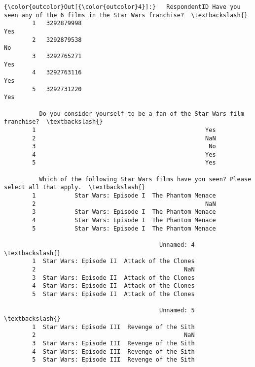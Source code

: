 \documentclass[11pt]{article}
\begin{document}
\begin{Verbatim}[commandchars=\\\{\}]
{\color{outcolor}Out[{\color{outcolor}4}]:}   RespondentID Have you seen any of the 6 films in the Star Wars franchise?  \textbackslash{}
        1   3292879998                                                Yes             
        2   3292879538                                                 No             
        3   3292765271                                                Yes             
        4   3292763116                                                Yes             
        5   3292731220                                                Yes             
        
          Do you consider yourself to be a fan of the Star Wars film franchise?  \textbackslash{}
        1                                                Yes                      
        2                                                NaN                      
        3                                                 No                      
        4                                                Yes                      
        5                                                Yes                      
        
          Which of the following Star Wars films have you seen? Please select all that apply.  \textbackslash{}
        1           Star Wars: Episode I  The Phantom Menace                                    
        2                                                NaN                                    
        3           Star Wars: Episode I  The Phantom Menace                                    
        4           Star Wars: Episode I  The Phantom Menace                                    
        5           Star Wars: Episode I  The Phantom Menace                                    
        
                                            Unnamed: 4  \textbackslash{}
        1  Star Wars: Episode II  Attack of the Clones   
        2                                          NaN   
        3  Star Wars: Episode II  Attack of the Clones   
        4  Star Wars: Episode II  Attack of the Clones   
        5  Star Wars: Episode II  Attack of the Clones   
        
                                            Unnamed: 5  \textbackslash{}
        1  Star Wars: Episode III  Revenge of the Sith   
        2                                          NaN   
        3  Star Wars: Episode III  Revenge of the Sith   
        4  Star Wars: Episode III  Revenge of the Sith   
        5  Star Wars: Episode III  Revenge of the Sith   
        

\end{Verbatim}
\end{document}

